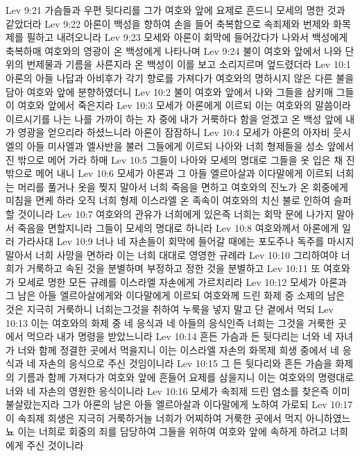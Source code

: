 Lev 9:21  가슴들과 우편 뒷다리를 그가 여호와 앞에 요제로 흔드니 모세의 명한 것과 같았더라
Lev 9:22  아론이 백성을 향하여 손을 들어 축복함으로 속죄제와 번제와 화목제를 필하고 내려오니라
Lev 9:23  모세와 아론이 회막에 들어갔다가 나와서 백성에게 축복하매 여호와의 영광이 온 백성에게 나타나며
Lev 9:24  불이 여호와 앞에서 나와 단 위의 번제물과 기름을 사른지라 온 백성이 이를 보고 소리지르며 엎드렸더라
Lev 10:1  아론의 아들 나답과 아비후가 각기 향로를 가져다가 여호와의 명하시지 않은 다른 불을 담아 여호와 앞에 분향하였더니
Lev 10:2  불이 여호와 앞에서 나와 그들을 삼키매 그들이 여호와 앞에서 죽은지라
Lev 10:3  모세가 아론에게 이르되 이는 여호와의 말씀이라 이르시기를 나는 나를 가까이 하는 자 중에 내가 거룩하다 함을 얻겠고 온 백성 앞에 내가 영광을 얻으리라 하셨느니라 아론이 잠잠하니
Lev 10:4  모세가 아론의 아자비 웃시엘의 아들 미사엘과 엘사반을 불러 그들에게 이르되 나아와 너희 형제들을 성소 앞에서 진 밖으로 메어 가라 하매
Lev 10:5  그들이 나아와 모세의 명대로 그들을 옷 입은 채 진 밖으로 메어 내니
Lev 10:6  모세가 아론과 그 아들 엘르아살과 이다말에게 이르되 너희는 머리를 풀거나 옷을 찢지 말아서 너희 죽음을 면하고 여호와의 진노가 온 회중에게 미침을 면케 하라 오직 너희 형제 이스라엘 온 족속이 여호와의 치신 불로 인하여 슬퍼할 것이니라
Lev 10:7  여호와의 관유가 너희에게 있은즉 너희는 회막 문에 나가지 말아서 죽음을 면할지니라 그들이 모세의 명대로 하니라
Lev 10:8  여호와께서 아론에게 일러 가라사대
Lev 10:9  너나 네 자손들이 회막에 들어갈 때에는 포도주나 독주를 마시지 말아서 너희 사망을 면하라 이는 너희 대대로 영영한 규례라
Lev 10:10  그리하여야 너희가 거룩하고 속된 것을 분별하며 부정하고 정한 것을 분별하고
Lev 10:11  또 여호와가 모세로 명한 모든 규례를 이스라엘 자손에게 가르치리라
Lev 10:12  모세가 아론과 그 남은 아들 엘르아살에게와 이다말에게 이르되 여호와께 드린 화제 중 소제의 남은 것은 지극히 거룩하니 너희는그것을 취하여 누룩을 넣지 말고 단 곁에서 먹되
Lev 10:13  이는 여호와의 화제 중 네 응식과 네 아들의 응식인즉 너희는 그것을 거룩한 곳에서 먹으라 내가 명령을 받았느니라
Lev 10:14  흔든 가슴과 든 뒷다리는 너와 네 자녀가 너와 함께 정결한 곳에서 먹을지니 이는 이스라엘 자손의 화목제 희생 중에서 네 응식과 네 자손의 응식으로 주신 것임이니라
Lev 10:15  그 든 뒷다리와 흔든 가슴을 화제의 기름과 함께 가져다가 여호와 앞에 흔들어 요제를 삼을지니 이는 여호와의 명령대로 너와 네 자손의 영원한 응식이니라
Lev 10:16  모세가 속죄제 드린 염소를 찾은즉 이미 불살랐는지라 그가 아론의 남은 아들 엘르아살과 이다말에게 노하여 가로되
Lev 10:17  이 속죄제 희생은 지극히 거룩하거늘 너희가 어찌하여 거룩한 곳에서 먹지 아니하였느뇨 이는 너희로 회중의 죄를 담당하여 그들을 위하여 여호와 앞에 속하게 하려고 너희에게 주신 것이니라
